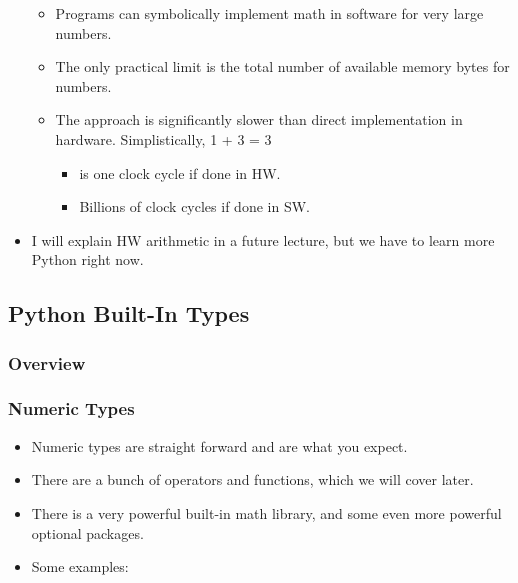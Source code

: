\documentclass[11pt]{article}
\providecommand{\tightlist}{%
      \setlength{\itemsep}{0pt}\setlength{\parskip}{0pt}}
\begin{document}
\begin{itemize}
  \begin{itemize}
  \tightlist
  \item
    Programs can symbolically implement math in software for very large
    numbers.
  \item
    The only practical limit is the total number of available memory
    bytes for numbers.
  \item
    The approach is significantly slower than direct implementation in
    hardware. Simplistically, 1 + 3 = 3

    \begin{itemize}
    \tightlist
    \item
      is one clock cycle if done in HW.
    \item
      Billions of clock cycles if done in SW.
    \end{itemize}
  \end{itemize}
\item
  I will explain HW arithmetic in a future lecture, but we have to learn
  more Python right now.
\end{itemize}

    \subsection{Python Built-In Types}\label{python-built-in-types}

\subsubsection{Overview}\label{overview}

    \subsubsection{Numeric Types}\label{numeric-types}

\begin{itemize}
\item
  Numeric types are straight forward and are what you expect.
\item
  There are a bunch of operators and functions, which we will cover
  later.
\item
  There is a very powerful built-in math library, and some even more
  powerful optional packages.
\item
  Some examples:
\end{itemize}
\end{document}
